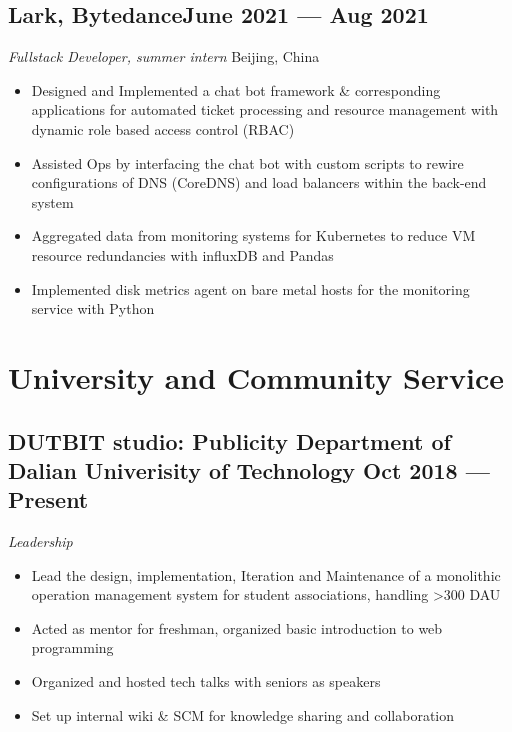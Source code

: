 \documentclass[a4,12pt]{article}
\newcommand{\subtext}[1]{
#1\par\vspace{-0.3cm}}
\newenvironment{zitemize}{
\begin{itemize}\itemsep0pt \parskip0pt \parsep1pt}
{\end{itemize}\vspace{-0.5cm}}
\begin{document}
\subsection*{Lark, Bytedance\hfill June 2021 --- Aug 2021} 
\subtext{\textit{Fullstack Developer, summer intern } \hfill Beijing, China} 
    \begin{zitemize}
        \item Designed and Implemented a chat bot framework \& corresponding applications for automated ticket processing and resource management with dynamic role based access control (RBAC)
        \item Assisted Ops by interfacing the chat bot with custom scripts to rewire configurations of DNS (CoreDNS) and load balancers within the back-end system
        \item Aggregated data from monitoring systems for Kubernetes to reduce VM resource redundancies with influxDB and Pandas
        \item Implemented disk metrics agent on bare metal hosts for the monitoring service with Python
    \end{zitemize}


\section{\textbf{University and Community Service}} %


\subsection*{DUTBIT studio: {\normalsize\normalfont Publicity Department of Dalian Univerisity of Technology} \hfill  Oct 2018 --- Present} 

\subtext{\textit{Leadership}}
\begin{zitemize}
    \item Lead the design, implementation, Iteration and Maintenance of a monolithic operation management system for student associations, handling >300 DAU
    \item Acted as mentor for freshman, organized basic introduction to web programming
    \item Organized and hosted tech talks with seniors as speakers
    \item Set up internal wiki \& SCM for knowledge sharing and collaboration
\end{zitemize}
\end{document}
